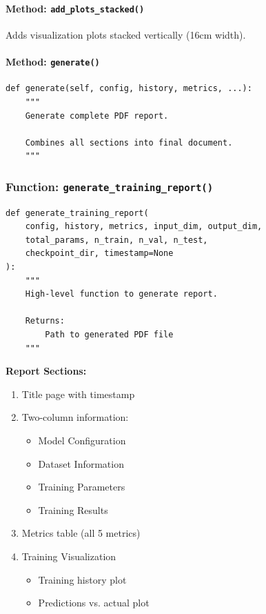 \documentclass[11pt,a4paper]{article}
\begin{document}
\paragraph{Method: \texttt{add\_plots\_stacked()}}
Adds visualization plots stacked vertically (16cm width).

\paragraph{Method: \texttt{generate()}}
\begin{lstlisting}
def generate(self, config, history, metrics, ...):
    """
    Generate complete PDF report.

    Combines all sections into final document.
    """
\end{lstlisting}

\subsubsection{Function: \texttt{generate\_training\_report()}}

\begin{lstlisting}
def generate_training_report(
    config, history, metrics, input_dim, output_dim,
    total_params, n_train, n_val, n_test,
    checkpoint_dir, timestamp=None
):
    """
    High-level function to generate report.

    Returns:
        Path to generated PDF file
    """
\end{lstlisting}

\textbf{Report Sections:}
\begin{enumerate}
    \item Title page with timestamp
    \item Two-column information:
    \begin{itemize}
        \item Model Configuration
        \item Dataset Information
        \item Training Parameters
        \item Training Results
    \end{itemize}
    \item Metrics table (all 5 metrics)
    \item Training Visualization
    \begin{itemize}
        \item Training history plot
        \item Predictions vs. actual plot
    \end{itemize}
\end{enumerate}
\end{document}
